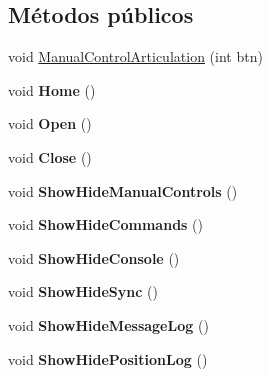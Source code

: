 \subsection*{Métodos públicos}
\begin{DoxyCompactItemize}
\item 
void \mbox{\hyperlink{class_game_controller_af2f693d76f1b9bf4ff0403802ad44cae}{Manual\+Control\+Articulation}} (int btn)
\item 
\mbox{\label{class_game_controller_a92a798e28f38aa15306e58dbdef1099a}} 
void {\bfseries Home} ()
\item 
\mbox{\label{class_game_controller_ab69f0ec04df1e4d52b182d1dddd0606c}} 
void {\bfseries Open} ()
\item 
\mbox{\label{class_game_controller_a232d433ba9f07944bcc274841bf8cc7c}} 
void {\bfseries Close} ()
\item 
\mbox{\label{class_game_controller_ab55a4d6d21f7e08aac2e27ad92033d56}} 
void {\bfseries Show\+Hide\+Manual\+Controls} ()
\item 
\mbox{\label{class_game_controller_a473137527a8eb571f745ba44752e0a79}} 
void {\bfseries Show\+Hide\+Commands} ()
\item 
\mbox{\label{class_game_controller_ad037a03af50093f97a244acb6ee7cfb5}} 
void {\bfseries Show\+Hide\+Console} ()
\item 
\mbox{\label{class_game_controller_a0c878163f61d0c5f249f06076eb4414b}} 
void {\bfseries Show\+Hide\+Sync} ()
\item 
\mbox{\label{class_game_controller_a3424f128577eb9fca02bc4eeb5c00f52}} 
void {\bfseries Show\+Hide\+Message\+Log} ()
\item 
\mbox{\label{class_game_controller_a4115faf1339706f462166c1f82d9ec8c}} 
void {\bfseries Show\+Hide\+Position\+Log} ()
\item 
\mbox{\label{class_game_controller_aad5d8a92a01bb1b946890c227e36ba41}} 

\end{DoxyCompactItemize}
